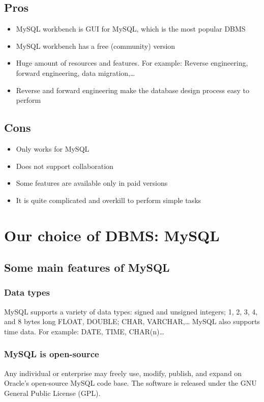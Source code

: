 \documentclass[a4paper]{article}
\numberwithin{equation}{section}
\begin{document}
\subsection{Pros}
\begin{itemize}
  \item MySQL workbench is GUI for MySQL, which is the most popular DBMS
  \item MySQL workbench has a free (community) version
  \item Huge amount of resources and features. For example: Reverse engineering, forward engineering, data migration,\dots
  \item Reverse and forward engineering make the database design process easy to perform
\end{itemize}

\subsection{Cons}
\begin{itemize}
  \item Only works for MySQL
  \item Does not support collaboration
  \item Some features are available only in paid versions
  \item It is quite complicated and overkill to perform simple tasks
\end{itemize}

\newpage

\section{Our choice of DBMS\@: MySQL }
\subsection{Some main features of MySQL}
\subsubsection{Data types}
MySQL supports a variety of data types: signed and unsigned integers; 1, 2, 3, 4, and 8 bytes long FLOAT, DOUBLE\@; CHAR, VARCHAR,\dots
MySQL also supports time data.
For example: DATE, TIME, CHAR(n)\dots

\subsubsection{MySQL is open-source}
Any individual or enterprise may freely use, modify, publish, and expand on Oracle’s open-source MySQL code base.
The software is released under the GNU General Public License (GPL).
\end{document}
